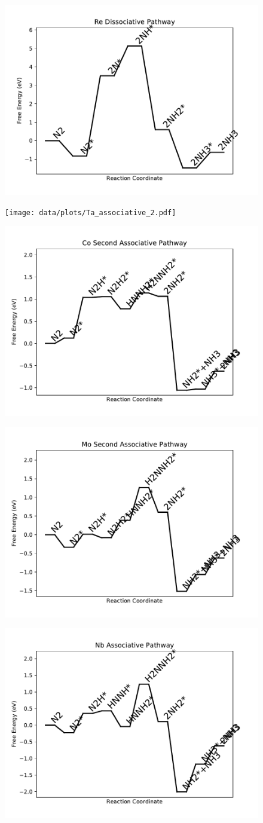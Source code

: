 \documentclass[journal=jacsat,manuscript=article]{achemso}
\begin{document}
\newpage
\begin{figure}
\includegraphics[width=0.5\linewidth]{data/plots/Re_dissociative.pdf}
\label{fig:Re_dissociative}
\end{figure}

\begin{figure}
\texttt{[image: data/plots/Ta\_associative\_2.pdf]}
\label{fig:Ta_associative_2}
\end{figure}

\newpage
\begin{figure}
\includegraphics[width=0.5\linewidth]{data/plots/Co_associative_2.pdf}
\label{fig:Co_associative_2}
\end{figure}

\begin{figure}
\includegraphics[width=0.5\linewidth]{data/plots/Mo_associative_2.pdf}
\label{fig:Mo_associative_2}
\end{figure}

\newpage
\begin{figure}
\includegraphics[width=0.5\linewidth]{data/plots/Nb_associative.pdf}
\label{fig:Nb_associative}
\end{figure}
\end{document}
